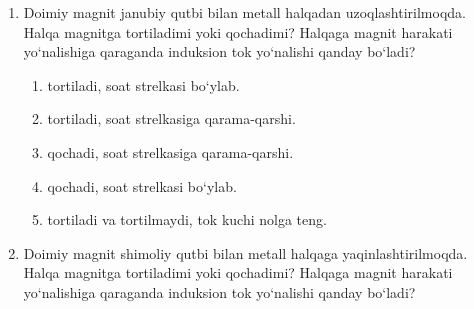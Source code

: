 \begin{enumerate}
\item Doimiy magnit janubiy qutbi bilan metall halqadan uzoqlashtirilmoqda. Halqa magnitga tortiladimi yoki qochadimi? Halqaga magnit harakati yo‘nalishiga qaraganda induksion tok yo‘nalishi qanday bo‘ladi?


\begin{enumerate}[label=\Alph*)]
\item tortiladi, soat strelkasi bo‘ylab.
\item tortiladi, soat strelkasiga qarama-qarshi.
\item qochadi, soat strelkasiga qarama-qarshi.
\item qochadi, soat strelkasi bo‘ylab.
\item tortiladi va tortilmaydi, tok kuchi nolga teng.
\end{enumerate}

\item Doimiy magnit shimoliy qutbi bilan metall halqaga yaqinlashtirilmoqda. Halqa magnitga tortiladimi yoki qochadimi? Halqaga magnit harakati yo‘nalishiga qaraganda induksion tok yo‘nalishi qanday bo‘ladi?

\end{enumerate}
